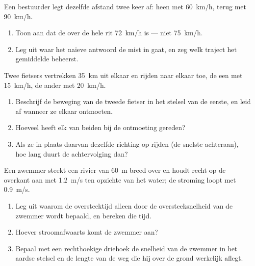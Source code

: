 \begin{exercise}[$\star\star\star$]\label{exo:g10:relative-motion:12}
Een bestuurder legt dezelfde afstand twee keer af: heen met
\qty{60}{km/h}, terug met \qty{90}{km/h}.
\begin{enumerate}
  \item Toon aan dat de  over de hele rit
        \qty{72}{km/h} is --- niet \qty{75}{km/h}.
  \item Leg uit waar het naïeve antwoord de mist in gaat, en zeg welk
        traject het gemiddelde beheerst.
\end{enumerate}
\end{exercise}

\begin{exercise}[$\star\star\star$]\label{exo:g10:relative-motion:13}
Twee fietsers vertrekken \qty{35}{km} uit elkaar en rijden naar elkaar
toe, de een met \qty{15}{km/h}, de ander met \qty{20}{km/h}.
\begin{enumerate}
  \item Beschrijf de beweging van de tweede fietser in het stelsel van de
        eerste, en leid af wanneer ze elkaar ontmoeten.
  \item Hoeveel heeft elk van beiden bij de ontmoeting gereden?
  \item Als ze in plaats daarvan dezelfde richting op rijden (de snelste
        achteraan), hoe lang duurt de achtervolging dan?
\end{enumerate}
\end{exercise}

\begin{exercise}[$\star\star\star$]\label{exo:g10:relative-motion:14}
Een zwemmer steekt een rivier van \qty{60}{m} breed over en houdt recht
op de overkant aan met \qty{1.2}{m/s} ten opzichte van het water; de
stroming loopt met \qty{0.9}{m/s}.
\begin{enumerate}
  \item Leg uit waarom de oversteektijd alleen door de oversteeksnelheid
        van de zwemmer wordt bepaald, en bereken die tijd.
  \item Hoever stroomafwaarts komt de zwemmer aan?
  \item Bepaal met een rechthoekige driehoek de snelheid van de zwemmer
        in het aardse stelsel en de lengte van de weg die hij over de
        grond werkelijk aflegt.
\end{enumerate}
\end{exercise}

